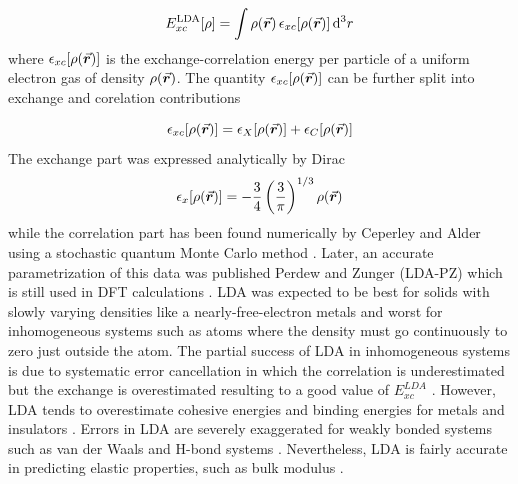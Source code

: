 \begin{equation} \label{eq:LDA-XC}
	E^{\text{LDA}}_{xc} [\rho]= \int \rho({\va*{r}}) \,\epsilon_{xc}[\rho({\va*{r}}) ] \dd[3]{r}
\end{equation}
where $\epsilon_{xc}[\rho({\va*{r}}) ]$ is the exchange-correlation energy per particle of a uniform electron gas of density $\rho({\va*{r}})$. The quantity $\epsilon_{xc}[\rho({\va*{r}}) ]$ can be further split into exchange and corelation contributions

\begin{equation}
	\epsilon_{xc}[\rho({\va*{r}}) ] = \epsilon_{X}[\rho({\va*{r}}) ] + \epsilon_{C}[\rho({\va*{r}})]
\end{equation}
The exchange part was expressed analytically by Dirac \citep{Dirac1930}
\begin{equation} \label{eq:Dirac-ex}
	\epsilon_{x}[\rho({\va*{r}}) ] = - \frac{3}{4} \left( \frac{3}{\pi} \right)^{1/3} \rho({\va*{r}})
\end{equation}
while the correlation part has been found  numerically by Ceperley and Alder \citep{Ceperley1980} using a stochastic quantum Monte Carlo method \citep{Foulkes2001}. Later, an accurate parametrization of this data was published Perdew and Zunger (LDA-PZ) which is still used in DFT calculations \citep{Perdew1981}. LDA was expected to be best for solids with slowly varying densities like  a nearly-free-electron metals and worst for inhomogeneous systems such as atoms where the density must go continuously to zero just outside the atom. The partial success of LDA in inhomogeneous systems is due to systematic error cancellation in which the correlation is underestimated  but the exchange is overestimated resulting to a good value of $E^{LDA}_{xc}$ \citep{Gunnarsson1976,Gunnarsson1977}. However, LDA tends to overestimate cohesive energies and binding energies for metals and insulators \citep{Staroverov2004,Csonka2009,Harl2010}. Errors in LDA are severely exaggerated for weakly bonded systems such as van der Waals and H-bond systems \citep{Lee1993,Hamann1997,Feibelman2008}. Nevertheless, LDA is fairly accurate in predicting elastic properties, such as bulk modulus \citep{Froyen1983,Tan2012}.

